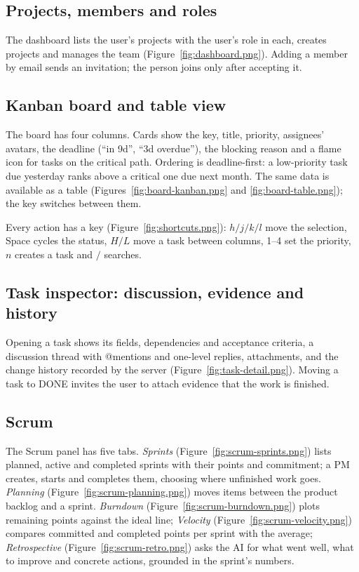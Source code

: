 \documentclass[../main.tex]{subfiles}
\begin{document}
\subsection{Projects, members and roles}
The dashboard lists the user's projects with the user's role in each, creates projects and manages
the team (Figure~\ref{fig:dashboard.png}). Adding a member by email sends an invitation; the person
joins only after accepting it.


\subsection{Kanban board and table view}
The board has four columns. Cards show the key, title, priority, assignees' avatars, the deadline
(``in 9d'', ``3d overdue''), the blocking reason and a flame icon for tasks on the critical path.
Ordering is deadline-first: a low-priority task due yesterday ranks above a critical one due next
month. The same data is available as a table (Figures~\ref{fig:board-kanban.png} and
\ref{fig:board-table.png}); the key  switches between them.


Every action has a key (Figure~\ref{fig:shortcuts.png}): $h/j/k/l$ move the selection, Space cycles
the status, $H/L$ move a task between columns, 1--4 set the priority, $n$ creates a task and $/$
searches.


\subsection{Task inspector: discussion, evidence and history}
Opening a task shows its fields, dependencies and acceptance criteria, a discussion thread with
@mentions and one-level replies, attachments, and the change history recorded by the server
(Figure~\ref{fig:task-detail.png}). Moving a task to DONE invites the user to attach evidence that
the work is finished.


\subsection{Scrum}
The Scrum panel has five tabs. \emph{Sprints} (Figure~\ref{fig:scrum-sprints.png}) lists planned,
active and completed sprints with their points and commitment; a PM creates, starts and completes
them, choosing where unfinished work goes. \emph{Planning} (Figure~\ref{fig:scrum-planning.png})
moves items between the product backlog and a sprint. \emph{Burndown}
(Figure~\ref{fig:scrum-burndown.png}) plots remaining points against the ideal line;
\emph{Velocity} (Figure~\ref{fig:scrum-velocity.png}) compares committed and completed points per
sprint with the average; \emph{Retrospective} (Figure~\ref{fig:scrum-retro.png}) asks the AI for
what went well, what to improve and concrete actions, grounded in the sprint's numbers.
\end{document}
